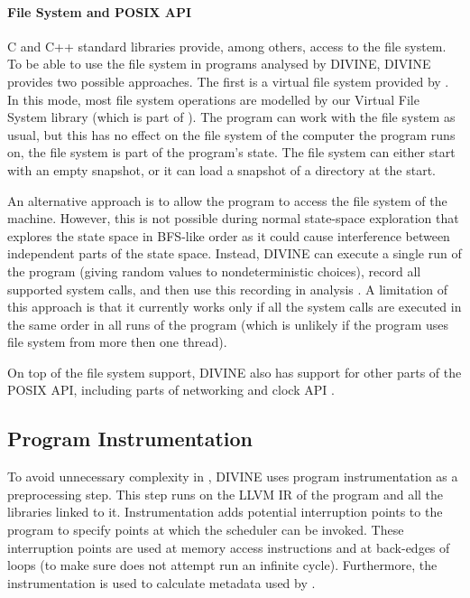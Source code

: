 \paragraph{File System and POSIX API}

C and C++ standard libraries provide, among others, access to the file system.
To be able to use the file system in programs analysed by DIVINE, DIVINE provides two possible approaches.
The first is a virtual file system provided by \dios.
In this mode, most file system operations are modelled by our Virtual File System library (which is part of \dios).
The program can work with the file system as usual, but this has no effect on the file system of the computer the program runs on, the file system is part of the program's state.
The file system can either start with an empty snapshot, or it can load a snapshot of a directory at the start.

An alternative approach is to allow the program to access the file system of the machine.
However, this is not possible during normal state-space exploration that explores the state space in BFS-like order as it could cause interference between independent parts of the state space.
Instead, DIVINE can execute a single run of the program (giving random values to nondeterministic choices), record all supported system calls, and then use this recording in analysis .
A limitation of this approach is that it currently works only if all the system calls are executed in the same order in all runs of the program (which is unlikely if the program uses file system from more then one thread).

On top of the file system support, DIVINE also has support for other parts of the POSIX API, including parts of networking and clock API .

\subsection{Program Instrumentation}

To avoid unnecessary complexity in \divm, DIVINE uses program instrumentation
as a preprocessing step.
This step runs on the LLVM IR of the program and all the libraries linked to it.
Instrumentation adds potential interruption points to the program to specify points at which the scheduler can be invoked.
These interruption points are used at memory access instructions and at
back-edges of loops (to make sure \divm does not attempt run an infinite
cycle).
Furthermore, the instrumentation is used to calculate metadata used by \dios.

